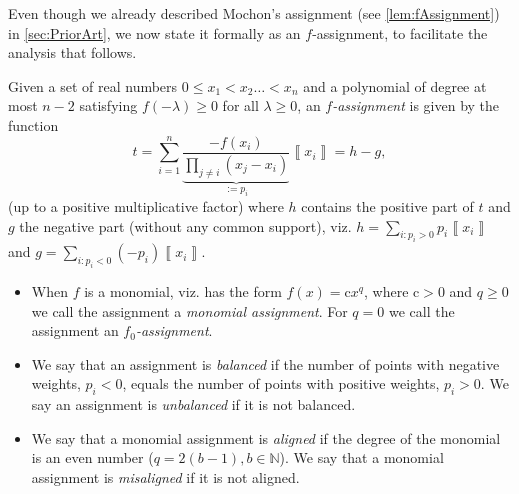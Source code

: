 \documentclass{theoretics}
\begin{document}
Even though we already described Mochon's assignment (see \cref{lem:fAssignment}) in \cref{sec:PriorArt}, we now state it formally as an $f$-assignment, to facilitate the analysis that follows.
%
\begin{definition}[$f$-assignments]
  Given a set of real numbers $0\le x_{1}<x_{2}\dots<x_{n}$ and a
  polynomial of degree at most $n-2$ satisfying $f(-\lambda)\ge0$
  for all $\lambda\ge0$, an \emph{$f$-assignment} is given by
  the function
  $$
    t=\sum_{i=1}^{n}\underbrace{\frac{-f(x_{i})}{\prod_{j\neq i}(x_{j}-x_{i})}}_{:=p_{i}}\left\llbracket x_{i}\right\rrbracket =h-g,
  $$
  (up to a positive multiplicative factor) where $h$ contains the positive
  part of $t$ and $g$ the negative part (without any common support),
  viz. $h=\sum_{i:p_{i}>0}p_{i}\left\llbracket x_{i}\right\rrbracket $
  and $g=\sum_{i:p_{i}<0}\left(-p_{i}\right)\left\llbracket x_{i}\right\rrbracket $.
  \label{def:f_assignment-f_0_assignment-balanced-m_kmonomial}
  \begin{itemize}
    \item When $f$ is a monomial, viz. has the form $f(x)=\text{c}x^{q}$, where $\text{c} >0$ and $q\geq 0$ we call
          the assignment a \emph{monomial assignment}. For $q=0$ we call the assignment an \emph{$f_{0}$-assignment}.
    \item We say that an assignment is \emph{balanced} if the number of points with
          negative weights, $p_{i}<0$, equals the number of points with positive
          weights, $p_{i}>0$. We say an assignment is \emph{unbalanced} if
          it is not balanced.
    \item We say that a monomial assignment is \emph{aligned} if the degree of the monomial is an even number ($q=2(b-1), b\in\mathbb{N}$). We say that a monomial assignment is \emph{misaligned} if it is not aligned.
  \end{itemize}
\end{definition}
\end{document}
